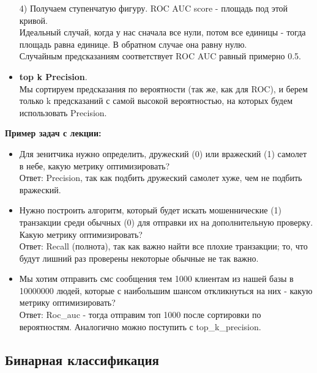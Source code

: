 \documentclass{article}
\begin{document}
\begin{itemize}
    4) Получаем ступенчатую фигуру. ROC AUC score - площадь под этой кривой.\\
    
    Идеальный случай, когда у нас сначала все нули, потом все единицы - тогда площадь равна единице. В обратном случае она равну нулю.\\
    Случайным предсказаниям соответствует ROC AUC равный примерно 0.5.
    
    \item \textbf{top k Precision}.\\
    Мы сортируем предсказания по вероятности (так же, как для ROC), и берем только k предсказаний с самой высокой вероятностью, на которых будем использовать Precision.
    
  \end{itemize}
  
  \textbf{Пример задач с лекции:}
  \begin{itemize}
  \item Для зенитчика нужно определить, дружеский (0) или вражеский (1) самолет в небе, какую метрику оптимизировать?\\
  
  Ответ: Precision, так как подбить дружеский самолет хуже, чем не подбить вражеский.\\
  
  \item Нужно построить алгоритм, который будет искать мошеннические (1) транзакции среди обычных (0) для отправки их на дополнительную проверку. Какую метрику оптимизировать?\\
  
  Ответ: Recall (полнота), так как важно найти все плохие транзакции; то, что будут лишний раз проверены некоторые обычные не так важно.\\
  
  \item Мы хотим отправить смс сообщения тем 1000 клиентам из нашей базы в 10000000 людей, которые с наибольшим шансом откликнуться на них - какую метрику оптимизировать?\\
  
  Ответ: Roc\_auc - тогда отправим топ 1000 после сортировки по вероятностям. Аналогично можно поступить с top\_k\_precision.
  \end{itemize}

 \subsection{Бинарная классификация}
\end{document}

